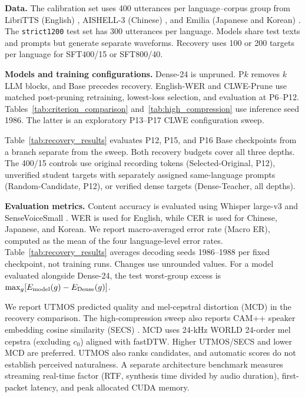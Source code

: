 \documentclass{article}
\begin{document}
\noindent\textbf{Data.}
The calibration set uses 400 utterances per language--corpus group from LibriTTS
(English) \cite{zen2019libritts}, AISHELL-3 (Chinese)
\cite{shi2021aishell3}, and Emilia (Japanese and Korean)
\cite{he2025emilia}. The \texttt{strict1200} test set has 300 utterances
per language. Models share test texts and prompts but generate separate
waveforms. Recovery uses 100 or 200 targets per language for
SFT400/15 or SFT800/40.


\noindent\textbf{Models and training configurations.}
Dense-24 is unpruned. P$k$ removes $k$ LLM blocks, and Base precedes
recovery. English-WER and CLWE-Prune use matched post-pruning retraining,
lowest-loss selection, and evaluation at P6--P12. Tables~\ref{tab:criterion_comparison}
and~\ref{tab:high_compression} use inference seed 1986. The latter is
an exploratory P13--P17 CLWE configuration sweep.

Table~\ref{tab:recovery_results} evaluates P12, P15, and P16 Base
checkpoints from a branch separate from the sweep. Both recovery
budgets cover all three depths. The 400/15 controls use original
recording tokens (Selected-Original, P12), unverified student targets
with separately assigned same-language prompts (Random-Candidate,
P12), or verified dense targets (Dense-Teacher, all depths).

\noindent\textbf{Evaluation metrics.}
Content accuracy is evaluated using Whisper large-v3
\cite{radford2023whisper} and SenseVoiceSmall
\cite{an2024funaudiollm}. WER is used for English, while CER is used for Chinese,
Japanese, and Korean. We report macro-averaged error rate (Macro ER),
computed as the mean of the four language-level error rates.
Table~\ref{tab:recovery_results} averages decoding seeds 1986--1988
per fixed checkpoint, not training runs. Changes use unrounded values.
For a model
evaluated alongside Dense-24, the test worst-group excess is
$\max_g[E_{\rm model}(g)-E_{\rm Dense}(g)]$.

We report UTMOS predicted quality \cite{saeki2022utmos} and
mel-cepstral distortion (MCD) in the recovery comparison. The
high-compression sweep also reports CAM++ speaker embedding cosine
similarity (SECS) \cite{wang2023campp}. MCD uses 24-kHz WORLD
24-order mel cepstra (excluding $c_0$) aligned with fastDTW.
Higher UTMOS/SECS and lower MCD are preferred. UTMOS also ranks
candidates, and automatic scores do not establish perceived naturalness.
A separate architecture benchmark measures
streaming real-time factor (RTF, synthesis time divided by audio
duration), first-packet latency, and peak allocated CUDA memory.
\end{document}
